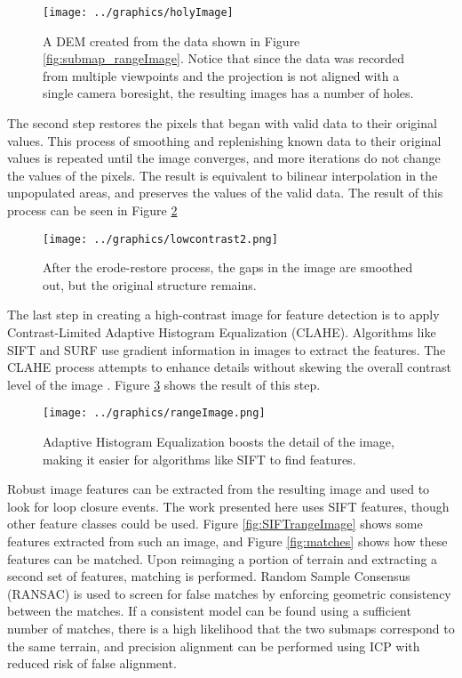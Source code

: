 \begin{figure}[htb]
   \centering
   \texttt{[image: ../graphics/holyImage]} %
   \caption{A DEM created from the data shown in Figure \ref{fig:submap_rangeImage}. Notice that since the data was recorded from multiple viewpoints and the projection is not aligned with a single camera boresight, the resulting images has a number of holes.}
   \label{fig:holyImage}
\end{figure}

The second step restores the pixels that began with valid data to their original values. This process of smoothing and replenishing known data to their original values is repeated until the image converges, and more iterations do not change the values of the pixels. The result is equivalent to bilinear interpolation in the unpopulated areas, and preserves the values of the valid data. The result of this process can be seen in Figure \ref{fig:rangeImage}

\begin{figure}[htb]
   \centering
   \texttt{[image: ../graphics/lowcontrast2.png]} %
   \caption{After the erode-restore process, the gaps in the image are smoothed out, but the original structure remains.}
   \label{fig:rangeImage}
\end{figure}

The last step in creating a high-contrast image for feature detection is to apply Contrast-Limited Adaptive Histogram Equalization (CLAHE). Algorithms like SIFT and SURF use gradient information in images to extract the features. The CLAHE process attempts to enhance details without skewing the overall contrast level of the image \cite{Reza2004}. Figure \ref{fig:rangeImageHC} shows the result of this step.

\begin{figure}[htb]
   \centering
   \texttt{[image: ../graphics/rangeImage.png]} %
   \caption{Adaptive Histogram Equalization boosts the detail of the image, making it easier for algorithms like SIFT to find features.}
   \label{fig:rangeImageHC}
\end{figure}

Robust image features can be extracted from the resulting image and used to look for loop closure events. The work presented here uses SIFT features, though other feature classes could be used. Figure \ref{fig:SIFTrangeImage} shows some features extracted from such an image, and Figure \ref{fig:matches} shows how these features can be matched. Upon reimaging a portion of terrain and extracting a second set of features, matching is performed. Random Sample Consensus (RANSAC) \cite{Fischler1981} is used to screen for false matches by enforcing geometric consistency between the matches. If a consistent model can be found using a sufficient number of matches, there is a high likelihood that the two submaps correspond to the same terrain, and precision alignment can be performed using ICP with reduced risk of false alignment. 

